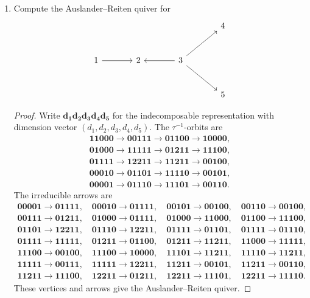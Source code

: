 \documentclass[11pt, a4paper]{article}
\newcommand{\vect}[1]{\mathbf{#1}}
\begin{document}
\begin{enumerate}[leftmargin=*, label=\textbf{\arabic*.}]
\begin{proof}
Similarly, rotating the diagonal labeled $1$ counterclockwise crosses exactly the diagonals $j$ for which there exists an oriented path
\[
j\rightsquigarrow 1.
\]
This is the dimension vector of the injective representation $I(1)$. Hence the counterclockwise rotation gives the diagonal corresponding to $I(1)$.
\end{proof}

\item Compute the Auslander--Reiten quiver for
\[
\begin{tikzcd}[column sep=large,row sep=large]
&&&4\\
1\arrow[r]&2&3\arrow[l]\arrow[ur]\arrow[dr]&\\
&&&5
\end{tikzcd}
\]

\begin{proof}
Write $\vect{d_1d_2d_3d_4d_5}$ for the indecomposable representation with dimension vector $(d_1,d_2,d_3,d_4,d_5)$. The $\tau^{-1}$-orbits are
\[
\begin{gathered}
\vect{11000}\to\vect{00111}\to\vect{01100}\to\vect{10000},\\
\vect{01000}\to\vect{11111}\to\vect{01211}\to\vect{11100},\\
\vect{01111}\to\vect{12211}\to\vect{11211}\to\vect{00100},\\
\vect{00010}\to\vect{01101}\to\vect{11110}\to\vect{00101},\\
\vect{00001}\to\vect{01110}\to\vect{11101}\to\vect{00110}.
\end{gathered}
\]
The irreducible arrows are
\[
\begin{gathered}
\vect{00001}\to\vect{01111},\quad \vect{00010}\to\vect{01111},\quad \vect{00101}\to\vect{00100},\quad \vect{00110}\to\vect{00100},\\
\vect{00111}\to\vect{01211},\quad \vect{01000}\to\vect{01111},\quad \vect{01000}\to\vect{11000},\quad \vect{01100}\to\vect{11100},\\
\vect{01101}\to\vect{12211},\quad \vect{01110}\to\vect{12211},\quad \vect{01111}\to\vect{01101},\quad \vect{01111}\to\vect{01110},\\
\vect{01111}\to\vect{11111},\quad \vect{01211}\to\vect{01100},\quad \vect{01211}\to\vect{11211},\quad \vect{11000}\to\vect{11111},\\
\vect{11100}\to\vect{00100},\quad \vect{11100}\to\vect{10000},\quad \vect{11101}\to\vect{11211},\quad \vect{11110}\to\vect{11211},\\
\vect{11111}\to\vect{00111},\quad \vect{11111}\to\vect{12211},\quad \vect{11211}\to\vect{00101},\quad \vect{11211}\to\vect{00110},\\
\vect{11211}\to\vect{11100},\quad \vect{12211}\to\vect{01211},\quad \vect{12211}\to\vect{11101},\quad \vect{12211}\to\vect{11110}.
\end{gathered}
\]
These vertices and arrows give the Auslander--Reiten quiver.
\end{proof}


\end{enumerate}
\end{document}

